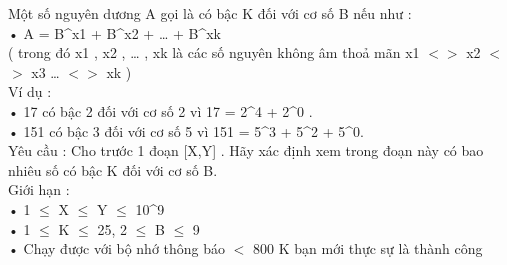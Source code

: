 Một số nguyên dương A gọi là có bậc K đối với cơ số B nếu như :   
\\   • A = B^x1 + B^x2 + … + B^xk   
\\   ( trong đó x1 , x2 , … , xk là các số nguyên không âm thoả mãn x1 $<$$>$ x2 $<$$>$ x3 … $<$$>$ xk )   
\\   Ví dụ :   
\\   • 17 có bậc 2 đối với cơ số 2 vì 17 = 2^4 + 2^0 .   
\\   • 151 có bậc 3 đối với cơ số 5 vì 151 = 5^3 + 5^2 + 5^0.   
\\   Yêu cầu : Cho trước 1 đoạn [X,Y] . Hãy xác định xem trong đoạn này có bao nhiêu số có bậc K đối với cơ số B.   
\\   Giới hạn :   
\\   • 1  $\le$  X  $\le$  Y  $\le$  10^9   
\\   • 1  $\le$  K  $\le$  25, 2  $\le$  B  $\le$  9   
\\   • Chạy được với bộ nhớ thông báo $<$ 800 K bạn mới thực sự là thành công   
\\

\